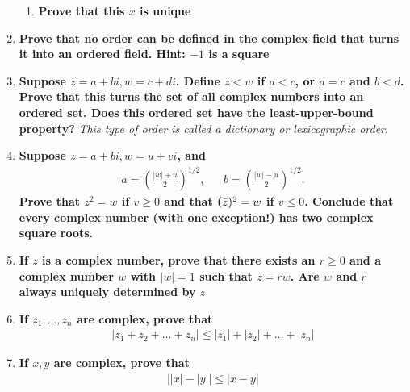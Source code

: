 \documentclass[Main.tex]{subfiles}
\begin{document}
\begin{enumerate}
\begin{enumerate}
            
        
        \item \textbf{Prove that this $x$ is unique}
        
            
        
    \end{enumerate}
    
    \item \textbf{Prove that no order can be defined in the complex field that turns it into an ordered field. Hint: $-1$ is a square}
    
        
    
    \item \textbf{Suppose $z=a+bi, w=c+di$. Define $z<w$ if $a<c$, or $a=c$ and $b<d$. Prove that this turns the set of all complex numbers into an ordered set. Does this ordered set have the least-upper-bound property?} \textit{This type of order is called a dictionary or lexicographic order}.
    
        
    
    \item \textbf{Suppose $z=a+bi,w=u+vi$, and}
    \begin{align*}
        a=\left( \frac{\lvert w\rvert + u}{2}\right)^{1/2}, && b=\left( \frac{\lvert w\rvert - u}{2}\right)^{1/2}.
    \end{align*}
    \textbf{Prove that $z^2=w$ if $v\geq 0$ and that ($\Bar{z})^2=w$ if $v\leq 0$. Conclude that every complex number (with one exception!) has two complex square roots.}
    
        
    
    \item \textbf{If $z$ is a complex number, prove that there exists an $r\geq 0$ and a complex number $w$ with $\lvert w\rvert=1$ such that $z=rw$. Are $w$ and $r$ always uniquely determined by $z$}
    
        
    
    \item \textbf{If $z_1,\dots ,z_n$ are complex, prove that}
    \begin{align*}
        \lvert z_1+z_2+\dots +z_n\rvert \leq \lvert z_1\rvert + \lvert z_2 \rvert + \dots + \lvert z_n \rvert 
    \end{align*}
    
        
    
    \item \textbf{If $x,y$ are complex, prove that }
    \begin{align*}
        \lvert\lvert x\rvert -\lvert y\rvert\rvert \leq \lvert x-y\rvert
    \end{align*}
    

\end{enumerate}
\end{document}
